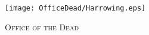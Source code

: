 \fancyhead[RE,LO]{}
\fancyhead[RO,LE]{}
\fancyhead[C]{}
\thispagestyle{empty}
{}
{}

\begin{figure}[H]
    \centering
    \texttt{[image: OfficeDead/Harrowing.eps]}
    \caption{\textsc{\Huge{Office of the Dead}}}
\end{figure}